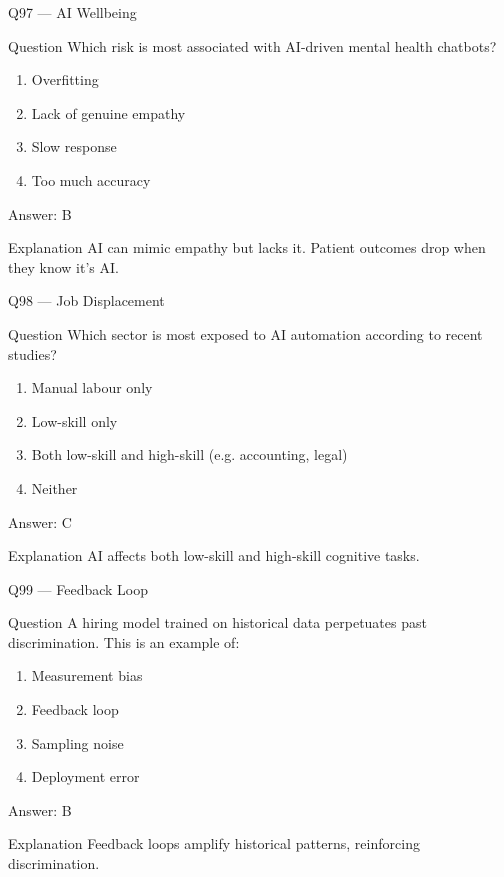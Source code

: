 \documentclass[aspectratio=169,8pt]{beamer}
\begin{document}
	\begin{frame}{Q97 --- AI Wellbeing}
		\begin{block}{Question}
			Which risk is most associated with AI-driven mental health chatbots?
		\end{block}
		\begin{enumerate}
			\item Overfitting
			\item Lack of genuine empathy
			\item Slow response
			\item Too much accuracy
		\end{enumerate}
		\begin{exampleblock}{Answer: B}\end{exampleblock}
		\begin{block}{Explanation}
			AI can mimic empathy but lacks it. Patient outcomes drop when they know it's AI.
		\end{block}
	\end{frame}
	
	\begin{frame}{Q98 --- Job Displacement}
		\begin{block}{Question}
			Which sector is most exposed to AI automation according to recent studies?
		\end{block}
		\begin{enumerate}
			\item Manual labour only
			\item Low-skill only
			\item Both low-skill and high-skill (e.g. accounting, legal)
			\item Neither
		\end{enumerate}
		\begin{exampleblock}{Answer: C}\end{exampleblock}
		\begin{block}{Explanation}
			AI affects both low-skill and high-skill cognitive tasks.
		\end{block}
	\end{frame}
	
	\begin{frame}{Q99 --- Feedback Loop}
		\begin{block}{Question}
			A hiring model trained on historical data perpetuates past discrimination. This is an example of:
		\end{block}
		\begin{enumerate}
			\item Measurement bias
			\item Feedback loop
			\item Sampling noise
			\item Deployment error
		\end{enumerate}
		\begin{exampleblock}{Answer: B}\end{exampleblock}
		\begin{block}{Explanation}
			Feedback loops amplify historical patterns, reinforcing discrimination.
		\end{block}
	\end{frame}
	
\end{document}

